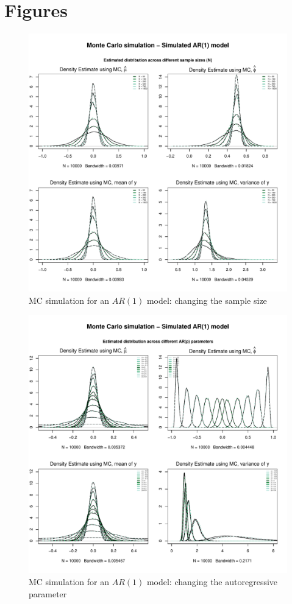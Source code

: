 \documentclass{article}
\begin{document}
\section{Figures}
\begin{figure}[hbt!]
\includegraphics[width=\textwidth]{plots/MC_AR1_densities_diff_smpl}
\caption{MC simulation for an $AR(1)$ model: changing the sample size}
\label{fig:MC_AR1_densities_diff_smpl}
\centering
\end{figure}

\begin{figure}[hbt!]
\includegraphics[width=\textwidth]{plots/MC_AR1_densities_diff_ARq}
\caption{MC simulation for an $AR(1)$ model: changing the autoregressive parameter}
\label{fig:MC_AR1_densities_diff_ARq}
\centering
\end{figure}
\end{document}
